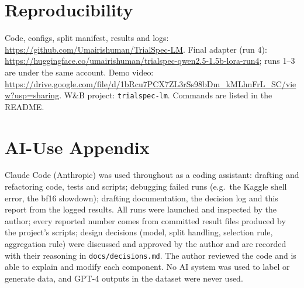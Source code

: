 \documentclass[conference]{IEEEtran}
\newcommand{\repourl}{https://github.com/Umairishuman/TrialSpec-LM}
\newcommand{\hfurl}{https://huggingface.co/umairishuman/trialspec-qwen2.5-1.5b-lora-run4}
\newcommand{\videourl}{https://drive.google.com/file/d/1bRcu7PCX7ZL3rSs98bDm_kMLhnFrL_SC/view?usp=sharing}
\begin{document}
\section*{Reproducibility}
Code, configs, split manifest, results and logs: \url{\repourl}. Final adapter (run 4): \url{\hfurl}; runs 1--3 are under the same account. Demo video: \url{\videourl}. W\&B project: \texttt{trialspec-lm}. Commands are listed in the README.

\appendix
\section*{AI-Use Appendix}
Claude Code (Anthropic) was used throughout as a coding assistant: drafting and refactoring code, tests and scripts; debugging failed runs (e.g.\ the Kaggle shell error, the bf16 slowdown); drafting documentation, the decision log and this report from the logged results. All runs were launched and inspected by the author; every reported number comes from committed result files produced by the project's scripts; design decisions (model, split handling, selection rule, aggregation rule) were discussed and approved by the author and are recorded with their reasoning in \texttt{docs/decisions.md}. The author reviewed the code and is able to explain and modify each component. No AI system was used to label or generate data, and GPT-4 outputs in the dataset were never used.
\end{document}
